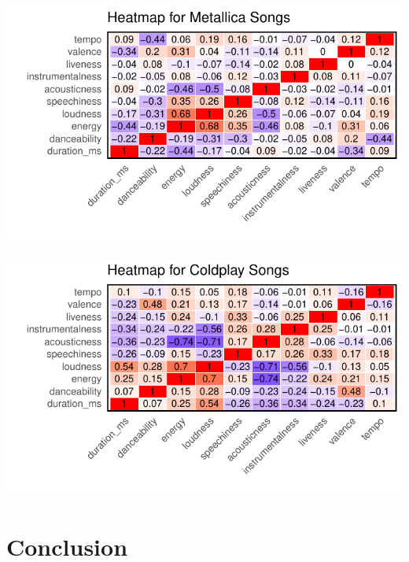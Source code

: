 \documentclass[11pt,preprint, authoryear]{elsarticle}
\let\origfigure\figure
\let\endorigfigure\endfigure
\renewenvironment{figure}[1][2] {
    \expandafter\origfigure\expandafter[H]
} {
    \endorigfigure
}
\numberwithin{equation}{section}
\numberwithin{figure}{section}
\numberwithin{table}{section}
\begin{document}
\begin{figure}[H]

{\centering \includegraphics{Question2_files/figure-latex/Figure4-1} 

}

\caption{Heatmap of Metallicas musical attributes\label{Figure4}}\label{fig:Figure4}
\end{figure}

\begin{figure}[H]

{\centering \includegraphics{Question2_files/figure-latex/Figure5-1} 

}

\caption{Heatmap of Coldplays musical attributes\label{Figure5}}\label{fig:Figure5}
\end{figure}

\section{Conclusion}\label{conclusion}


\end{document}

